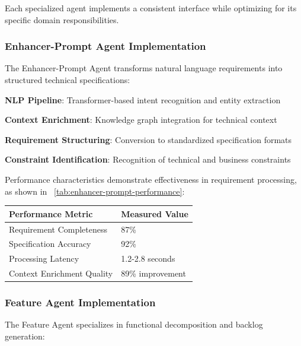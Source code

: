 Each specialized agent implements a consistent interface while optimizing for its specific domain responsibilities.

\subsubsection*{Enhancer-Prompt Agent Implementation}

The Enhancer-Prompt Agent transforms natural language requirements into structured technical specifications:

\begin{compactlist}
    \item \textbf{NLP Pipeline}: Transformer-based intent recognition and entity extraction
    \item \textbf{Context Enrichment}: Knowledge graph integration for technical context
    \item \textbf{Requirement Structuring}: Conversion to standardized specification formats
    \item \textbf{Constraint Identification}: Recognition of technical and business constraints
\end{compactlist}

Performance characteristics demonstrate effectiveness in requirement processing, as shown in ~\ref{tab:enhancer-prompt-performance}:

\begin{center}
\begin{tabular}{@{}ll@{}}
\toprule
\textbf{Performance Metric} & \textbf{Measured Value} \\
\midrule
Requirement Completeness & 87\% \\
Specification Accuracy & 92\% \\
Processing Latency & 1.2-2.8 seconds \\
Context Enrichment Quality & 89\% improvement \\
\bottomrule
\end{tabular}
\label{tab:enhancer-prompt-performance}
\end{center}

\subsubsection*{Feature Agent Implementation}

The Feature Agent specializes in functional decomposition and backlog generation:

